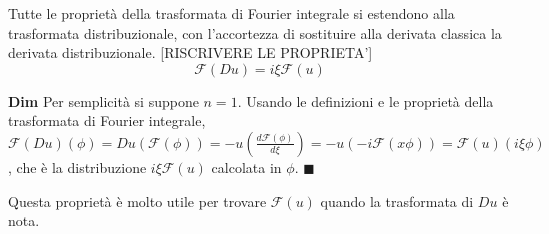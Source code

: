 \documentclass{article}
\begin{document}
Tutte le propriet\`{a} della trasformata di Fourier integrale si estendono
alla trasformata distribuzionale, con l'accortezza di sostituire alla
derivata classica la derivata distribuzionale. [RISCRIVERE LE PROPRIETA']%
\begin{equation*}
\mathcal{F}\left( Du\right) =i\xi \mathcal{F}\left( u\right)
\end{equation*}

\textbf{Dim} Per semplicit\`{a} si suppone $n=1$. Usando le definizioni e le
propriet\`{a} della trasformata di Fourier integrale, $\mathcal{F}\left(
Du\right) \left( \phi \right) =Du\left( \mathcal{F}\left( \phi \right)
\right) =-u\left( \frac{d\mathcal{F}\left( \phi \right) }{d\xi }\right)
=-u\left( -i\mathcal{F}\left( x\phi \right) \right) =\mathcal{F}\left(
u\right) \left( i\xi \phi \right) $, che \`{e} la distribuzione $i\xi 
\mathcal{F}\left( u\right) $ calcolata in $\phi $. $\blacksquare $

Questa propriet\`{a} \`{e} molto utile per trovare $\mathcal{F}\left(
u\right) $ quando la trasformata di $Du$ \`{e} nota.
\end{document}
